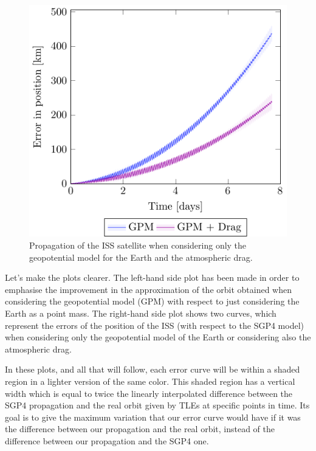 \documentclass[../main.tex]{subfiles}
\begin{document}
\begin{figure}[htbp]
\begin{minipage}[ht]{0.45\textwidth}
    \includegraphics[width=\textwidth]{Images/simulation/ISS.pdf}
    \caption{Propagation of the ISS satellite when considering only the geopotential model for the Earth and the atmospheric drag.}
    \label{fig:ISS}
  \end{minipage}
\end{figure}

Let's make the plots clearer. The left-hand side plot has been made in order to emphasise the improvement in the approximation of the orbit obtained when considering the geopotential model (GPM) with respect to just considering the Earth as a point mass. The right-hand side plot shows two curves, which represent the errors of the position of the ISS (with respect to the SGP4 model) when considering only the geopotential model of the Earth or considering also the atmospheric drag.

In these plots, and all that will follow, each error curve will be within a shaded region in a lighter version of the same color. This shaded region has a vertical width which is equal to twice the linearly interpolated difference between the SGP4 propagation and the real orbit given by TLEs at specific points in time. Its goal is to give the maximum variation that our error curve would have if it was the difference between our propagation and the real orbit, instead of the difference between our propagation and the SGP4 one.
\end{document}
